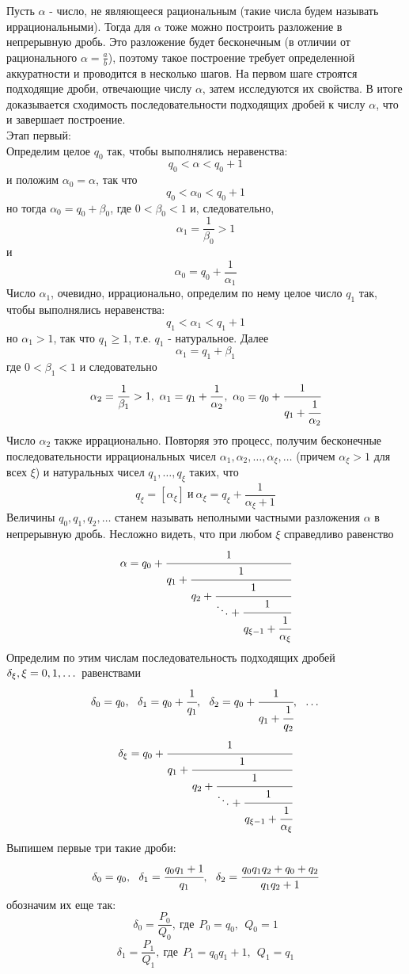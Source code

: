     Пусть $\alpha$ - число, не являющееся рациональным (такие числа будем называть иррациональными). Тогда для $\alpha$ тоже можно построить разложение в непрерывную дробь. Это разложение будет бесконечным (в отличии от рационального $\alpha=\frac{a}{b}$), поэтому такое построение требует определенной аккуратности и проводится в несколько шагов. На первом шаге строятся подходящие дроби, отвечающие числу $\alpha$, затем исследуются их свойства. В итоге доказывается сходимость последовательности подходящих дробей к числу $\alpha$, что и завершает построение.\\
    Этап первый:\\
    Определим целое $q_0$ так, чтобы выполнялись неравенства: \[q_0<\alpha<q_0+1\] и положим $\alpha_0=\alpha$, так что \[q_0<\alpha_0<q_0+1\] но тогда $\alpha_0=q_0+\beta_0$, где $0<\beta_0<1$ и, следовательно, \[\alpha_1=\frac{1}{\beta_0}>1\] и \[\alpha_0=q_0+\frac{1}{\alpha_1}\] Число $\alpha_1$, очевидно, иррационально, определим по нему целое число $q_1$ так, чтобы выполнялись неравенства: \[q_1<\alpha_1<q_1+1\] но $\alpha_1>1$, так что $q_1\geq 1$, т.е. $q_1$ - натуральное. Далее \[\alpha_1=q_1+\beta_1\] где $0<\beta_1<1$ и следовательно \[\alpha_2=\frac{1}{\beta_1}>1,\ \alpha_1=q_1+\frac{1}{\alpha_2},\ \alpha_0=q_0+\cfrac{1}{q_1+\cfrac{1}{\alpha_2}}\] Число $\alpha_2$ также иррационально. Повторяя это процесс, получим бесконечные последовательности иррациональных чисел $\alpha_1, \alpha_2,\dots, \alpha_{\xi},\dots$ (причем $\alpha_{\xi}>1$ для всех $\xi$) и натуральных чисел $q_1,\dots, q_{\xi}$ таких, что \[q_{\xi}=[\alpha_{\xi}]\ \text{и} \ \alpha_{\xi}=q_{\xi}+\frac{1}{\alpha_{\xi}+1}\] 
    Величины $q_0,q_1,q_2,\dots$ станем называть неполными частными разложения $\alpha$ в непрерывную дробь.
    Несложно видеть, что при любом $\xi$ справедливо равенство \[\alpha=q_0+\cfrac{1}{q_1+\cfrac{1}{q_2+\cfrac{1}{\ddots+\cfrac{1}{q_{\xi-1}+\cfrac{1}{\alpha_{\xi}}}}}}\]
    Определим по этим числам последовательность подходящих дробей $\delta_{\xi},\\
    \xi=0,1,\dots$ равенствами
    \[\delta_0=q_0,\ \ \delta_1=q_0+\cfrac{1}{q_1},\ \ \delta_2=q_0+\cfrac{1}{q_1+\cfrac{1}{q_2}},\ \ \dots\]
    \[\delta_{\xi}=q_0+\cfrac{1}{q_1+\cfrac{1}{q_2+\cfrac{1}{\ddots+\cfrac{1}{q_{\xi-1}+\cfrac{1}{\alpha_{\xi}}}}}}\]
    Выпишем первые три такие дроби:
    \[\delta_0=q_0,\ \ \delta_1=\cfrac{q_0 q_1+1}{q_1},\ \ \delta_2=\cfrac{q_0 q_1 q_2+q_0+q_2}{q_1 q_2+1}\]
    обозначим их еще так:
    \[\delta_0=\frac{P_0}{Q_0},\ \text{где}\ \ P_0=q_0,\ \ Q_0=1\]
    \[\delta_1=\frac{P_1}{Q_1},\ \text{где}\ \ P_1=q_0 q_1+1,\ \ Q_1=q_1\]
